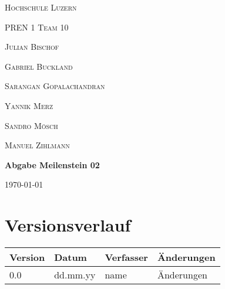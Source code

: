 \documentclass{scrarticle}                %
\newcommand{\Abgabenummer}{02}
\begin{document}

\begin{titlepage}
    \centering
    {\scshape\LARGE Hochschule Luzern \par}
    \vspace{1cm}
    {\scshape\Large PREN 1 Team 10\par}
    \vspace{1cm}

    {\scshape\large Julian Bischof\par}
    {\scshape\large Gabriel Buckland\par}
    {\scshape\large Sarangan Gopalachandran \par}
    {\scshape\large Yannik Merz\par}
    {\scshape\large Sandro Mösch\par}
    {\scshape\large Manuel Zihlmann\par}

    \vspace{1.5cm}
    {\huge\bfseries Abgabe Meilenstein \Abgabenummer \par}

    \vfill
    {\large \today\par}
\end{titlepage}

\newpage


\section*{Versionsverlauf}

\thispagestyle{nofooter}

\begin{longtable}{|p{2cm}|p{3cm}|p{3cm}|p{5cm}|}
    \hline
    \textbf{Version} & \textbf{Datum} & \textbf{Verfasser} & \textbf{Änderungen} \\
    \hline
    0.0              & dd.mm.yy       & name               & Änderungen          \\
    \hline
\end{longtable}
\end{document}

